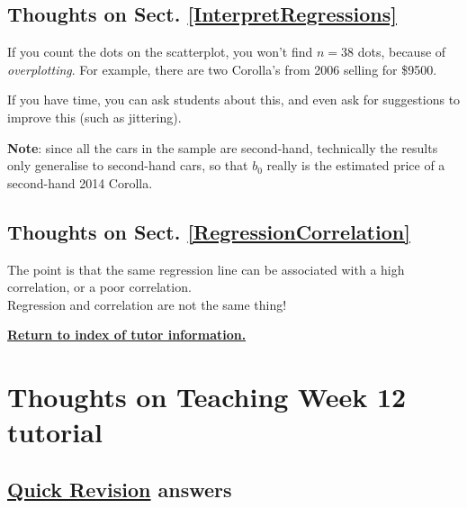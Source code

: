 \documentclass[
  11pt,
  a4paper,
  krantz2]{krantz}
\begin{document}
\subsection{Thoughts on Sect. \ref{InterpretRegressions}}\label{thoughts-on-sect.-refinterpretregressions}

If you count the dots on the scatterplot, you won't find \(n = 38\) dots, because of \emph{overplotting}.
For example, there are two Corolla's from 2006 selling for \$9500.

If you have time, you can ask students about this, and even ask for suggestions to improve this (such as jittering).

\textbf{Note}: since all the cars in the sample are second-hand, technically the results only generalise to second-hand cars, so that \(b_0\) really is the estimated price of a second-hand 2014 Corolla.

\subsection{Thoughts on Sect. \ref{RegressionCorrelation}}\label{thoughts-on-sect.-refregressioncorrelation}

The point is that the same regression line can be associated with a high correlation, or a poor correlation.\\
Regression and correlation are not the same thing!

\hyperref[TutorInfo]{\textbf{Return to index of tutor information.}}

\section{Thoughts on Teaching Week 12 tutorial}\label{Lecture12ThoughtsForTutors}

\subsection{\texorpdfstring{\hyperref[QuickRevision-Tutorial12]{Quick Revision} answers}{Quick Revision answers}}\label{quick-revision-answers-11}
\end{document}
